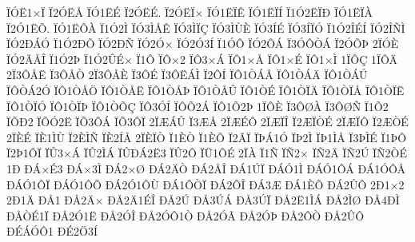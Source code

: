 {^^cf^^d3^^cb1^^d7^^cf
^^cf2^^d3^^cb^^c5
^^cf^^d31^^cb^^c9
^^cf2^^d3^^cb^^c9.
^^cf2^^d3^^cb^^cf^^d7
^^cf^^d31^^cb^^cf^^ca
^^cf^^d31^^cb^^cf^^cd
^^cf1^^d32^^cb^^cf^^d0
^^cf^^d31^^cb^^cf^^c0
^^cf2^^d31^^cb^^d5.
^^cf^^d31^^cb^^d5^^c0
^^cf1^^d32^^cc
^^cf^^d33^^cc^^c5^^ca
^^cf^^d33^^cc^^cf^^c7
^^cf^^d33^^cc^^d9^^c8
^^cf^^d33^^cd^^c9
^^cf^^d33^^cd^^cf^^d3
^^cf1^^d32^^ce^^c9^^cd
^^cf^^d32^^ce^^d1^^cc
^^cf^^d32^^d0^^c1^^d3
^^cf1^^d32^^d0^^d5
^^cf^^d32^^d0^^d1
^^cf^^d32^^d3^^d7
^^cf^^d32^^d33^^cd
^^cf1^^d3^^d4
^^cf^^d32^^d4^^c1
^^cf3^^d3^^d4^^d2^^c1
^^cf2^^d3^^d5^^de
2^^cf^^d3^^c8
^^cf^^d32^^c3^^c5^^ce
^^cf1^^d32^^de
^^cf1^^d32^^db^^c9^^d7
^^cf1^^d4
^^cf^^d4^^d72
^^cf^^d43^^d7^^c1
^^cf^^d41^^d7^^c5
^^cf^^d41^^d7^^c9
^^cf^^d41^^d7^^cc
1^^cf^^d4^^c7
1^^cf^^d4^^c4
2^^cf3^^d4^^c5^^cb
^^cf3^^d4^^c5^^d2
2^^cf3^^d4^^c5^^c8
^^cf3^^d4^^c9
^^cf3^^d4^^cb^^c1^^cc
^^cf2^^d4^^cd
^^cf^^d41^^d2^^c1^^c2
^^cf^^d41^^d2^^c1^^c4
^^cf^^d41^^d2^^c1^^da
^^cf^^d4^^d2^^c12^^d3
^^cf^^d41^^d2^^c5^^d6
^^cf^^d41^^d2^^c5^^cb
^^cf^^d41^^d2^^c5^^de
^^cf^^d41^^d2^^c5^^db
^^cf^^d41^^d2^^c9
^^cf^^d41^^d2^^cf^^c4
^^cf^^d41^^d2^^cf^^c5
^^cf^^d41^^d2^^cf^^cb
^^cf^^d41^^d2^^cf^^d3
^^cf^^d41^^d2^^cf^^de
^^cf^^d41^^d2^^d5^^c7
^^cf^^d43^^d3^^cd
^^cf^^d4^^d52^^c1
^^cf^^d41^^d52^^de
1^^cf^^d4^^c8
^^cf3^^d4^^d8^^c0
^^cf3^^d4^^d8^^d1
^^cf1^^d52
^^cf^^d5^^d02
^^cf^^d5^^d32^^cb
^^cf^^d53^^d4^^c1
^^cf^^d53^^d4^^cf
2^^cf^^c6^^c1^^db
^^cf3^^c6^^c5
2^^cf^^c6^^c9^^d4
2^^cf^^c6^^cf^^ce
^^cf2^^c6^^cf^^d2^^c9
2^^cf^^c6^^cf^^d4
^^cf2^^c6^^d2^^c9
2^^cf^^c8^^c9
^^cf^^c81^^cc^^d9
^^cf2^^c8^^cc^^d1
^^cf^^c82^^cd^^c5
2^^cf^^c8^^cf^^d2
^^cf1^^c8^^d2
^^cf1^^c8^^d5
^^cf2^^c3^^cf
^^cf^^de^^c11^^d3
^^cf^^de2^^cc
^^cf^^de1^^cc^^c5
^^cf3^^de^^cc^^c9
^^cf1^^de^^d4
^^cf2^^de1^^d4^^cf
^^cf^^db3^^d7^^c1
^^cf^^db2^^cc^^c1
^^cf^^db^^d0^^c12^^cb3
^^cf^^db2^^d4
^^cf^^dc1^^d4^^c9
2^^cf^^c0
^^cf1^^d1
^^cf^^d12^^d7
^^cf^^d12^^c4
^^cf^^d12^^da
^^cf^^d12^^d2^^c9
1^^d0
^^d0^^c1^^d7^^c93
^^d0^^c1^^d73^^cc
^^d0^^c12^^d7^^d8
^^d0^^c12^^c4^^d2
^^d0^^c12^^c5^^ce
^^d0^^c11^^da^^cf
^^d0^^c1^^d31^^cc
^^d0^^c1^^d31^^d4^^c1
^^d0^^c11^^d3^^d4^^c5
^^d0^^c1^^d31^^d4^^cf
^^d0^^c1^^d31^^d4^^d5
^^d0^^c12^^d31^^d4^^d9
^^d0^^c11^^d4^^d2^^cf
^^d0^^c12^^d5^^ce
^^d0^^c13^^c6
^^d0^^c11^^c8^^d5
^^d0^^c12^^db^^d4
2^^d01^^d72
2^^d01^^c4
^^d0^^c51
^^d0^^c52^^c4^^d7
^^d0^^c52^^c41^^c9^^ce
^^d0^^c52^^da
^^d0^^c53^^da^^c1
^^d0^^c53^^da^^cf
^^d0^^c52^^cb1^^cc^^c1
^^d0^^c52^^cc^^d8
^^d0^^c54^^d0^^cc
^^d0^^c5^^d2^^c91^^cf
^^d0^^c52^^d31^^cb
^^d0^^c52^^d3^^ce
^^d0^^c52^^d3^^d41^^d2
^^d0^^c52^^d3^^c3
^^d0^^c52^^d3^^de
^^d0^^c52^^d4^^d2
^^d0^^c52^^db^^d4
^^d0^^c9^^c1^^d3^^d41
^^d0^^c92^^d63^^cd
}

